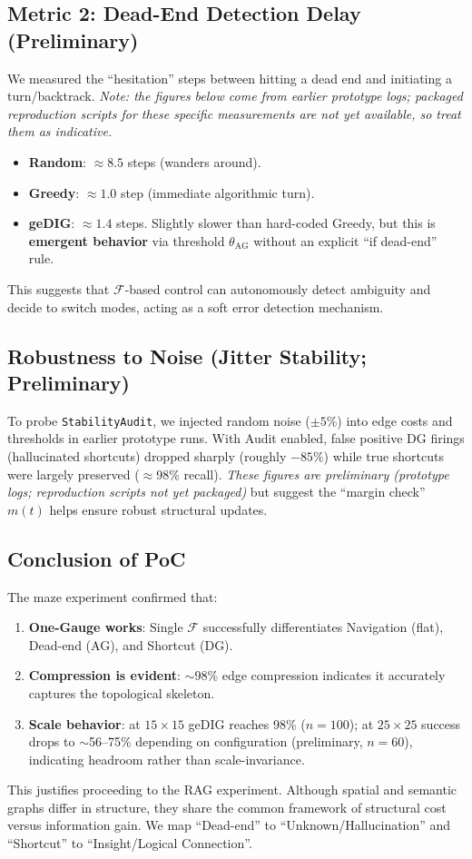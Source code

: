 \documentclass[12pt]{article}
\newcommand{\F}{\mathcal{F}}
\begin{document}
\subsection{Metric 2: Dead-End Detection Delay (Preliminary)}
We measured the ``hesitation'' steps between hitting a dead end and initiating a turn/backtrack.
\textit{Note: the figures below come from earlier prototype logs; packaged reproduction scripts for these specific measurements are not yet available, so treat them as indicative.}
\begin{itemize}
    \item \textbf{Random}: $\approx 8.5$ steps (wanders around).
    \item \textbf{Greedy}: $\approx 1.0$ step (immediate algorithmic turn).
    \item \textbf{geDIG}: $\approx 1.4$ steps. Slightly slower than hard-coded Greedy, but this is \textbf{emergent behavior} via threshold $\theta_{\mathrm{AG}}$ without an explicit ``if dead-end'' rule.
\end{itemize}
This suggests that $\F$-based control can autonomously detect ambiguity and decide to switch modes, acting as a soft error detection mechanism.

\subsection{Robustness to Noise (Jitter Stability; Preliminary)}
To probe \verb|StabilityAudit|, we injected random noise ($\pm 5\%$) into edge costs and thresholds in earlier prototype runs.
With Audit enabled, false positive DG firings (hallucinated shortcuts) dropped sharply (roughly $-85\%$) while true shortcuts were largely preserved ($\approx$98\% recall).
\textit{These figures are preliminary (prototype logs; reproduction scripts not yet packaged)} but suggest the ``margin check'' $m(t)$ helps ensure robust structural updates.

\subsection{Conclusion of PoC}
The maze experiment confirmed that:
\begin{enumerate}
    \item \textbf{One-Gauge works}: Single $\F$ successfully differentiates Navigation (flat), Dead-end (AG), and Shortcut (DG).
    \item \textbf{Compression is evident}: $\sim$98\% edge compression indicates it accurately captures the topological skeleton.
    \item \textbf{Scale behavior}: at $15{\times}15$ geDIG reaches 98\% ($n{=}100$); at $25{\times}25$ success drops to $\sim$56--75\% depending on configuration (preliminary, $n{=}60$), indicating headroom rather than scale-invariance.
\end{enumerate}
This justifies proceeding to the RAG experiment. Although spatial and semantic graphs differ in structure, they share the common framework of structural cost versus information gain. We map ``Dead-end'' to ``Unknown/Hallucination'' and ``Shortcut'' to ``Insight/Logical Connection''.
\end{document}
